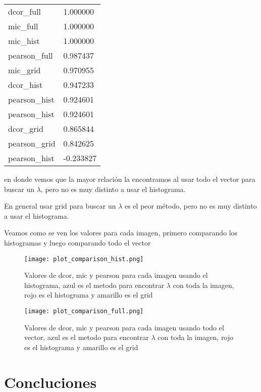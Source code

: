     \begin{table}[H]
        \begin{tabular}{ll}
        dcor\_full    & 1.000000  \\
        mic\_full     & 1.000000  \\
        mic\_hist     & 1.000000  \\
        pearson\_full & 0.987437  \\
        mic\_grid     & 0.970955  \\
        dcor\_hist    & 0.947233  \\
        pearson\_hist & 0.924601  \\
        pearson\_hist & 0.924601  \\
        dcor\_grid    & 0.865844  \\
        pearson\_grid & 0.842625  \\
        pearson\_hist & -0.233827
        \end{tabular}
    \end{table}

    en donde vemos que la mayor relaci\'on la encontramos al usar todo el vector para buscar un $\lambda$, pero no es muy distinto a usar el histograma.

    En general usar grid para buscar un $\lambda$ es el peor m\'etodo, pero no es muy distinto a usar el histograma.

    Veamos como se ven los valores para cada imagen, primero comparando los histogramas y luego comparando todo el vector

    \begin{figure}[H]
        \centering
        \texttt{[image: plot\_comparison\_hist.png]}
        \caption{Valores de dcor, mic y pearson para cada imagen usando el histograma, azul es el metodo para encontrar $\lambda$ con toda la imagen, rojo es el histograma y amarillo es el grid}
    \end{figure}


    \begin{figure}[H]
        \centering
        \texttt{[image: plot\_comparison\_full.png]}
        \caption{Valores de dcor, mic y pearson para cada imagen usando todo el vector, azul es el metodo para encontrar $\lambda$ con toda la imagen, rojo es el histograma y amarillo es el grid}
    \end{figure}

\section{Concluciones}

